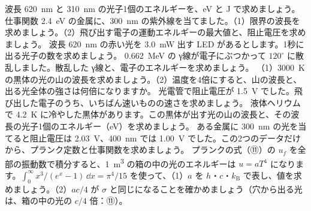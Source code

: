 \bkendproblems
{}
\bkproblem 波長 \qty{620}{nm} と \qty{310}{nm} の光子1個のエネルギーを、eV と J で求めましょう。
\bkproblem 仕事関数 \qty{2.4}{eV} の金属に、\qty{300}{nm} の紫外線を当てました。（1）限界の波長を求めましょう。（2）飛び出す電子の運動エネルギーの最大値と、阻止電圧を求めましょう。
\bkproblem 波長 \qty{620}{nm} の赤い光を \qty{3.0}{mW} 出す LED があるとします。1秒に出る光子の数を求めましょう。
\bkproblem \qty{0.662}{MeV} の γ線が電子にぶつかって $120^\circ$ に散乱しました。散乱した γ線と、電子のエネルギーを求めましょう。
\bkproblem （1）\qty{3000}{K}の黒体の光の山の波長を求めましょう。（2）温度を4倍にすると、山の波長と、出る光全体の強さは何倍になりますか。
\bkproblem 光電管で阻止電圧が \qty{1.5}{V} でした。飛び出した電子のうち、いちばん速いものの速さを求めましょう。
\bkproblem 液体ヘリウムで \qty{4.2}{K} に冷やした黒体があります。この黒体が出す光の山の波長と、その波長の光子1個のエネルギー（eV）を求めましょう。
\bkproblem ある金属に \qty{300}{nm} の光を当てると阻止電圧は \qty{2.03}{V}、\qty{400}{nm} では \qty{1.00}{V} でした。この2つのデータだけから、プランク定数と仕事関数を求めましょう。
\bkproblem プランクの式（⑪）の $u_f$ を全部の振動数で積分すると、\qty{1}{m^3} の箱の中の光のエネルギーは $u=aT^4$ になります。$\int_0^\infty x^3/(e^x-1)\,\dd x=\pi^4/15$ を使って、（1）$a$ を $h$・$c$・$k_{\mathrm B}$ で表し、値を求めましょう。（2）$ac/4$ が $\sigma$ と同じになることを確かめましょう（穴から出る光は、箱の中の光の $c/4$ 倍：⑪）。
